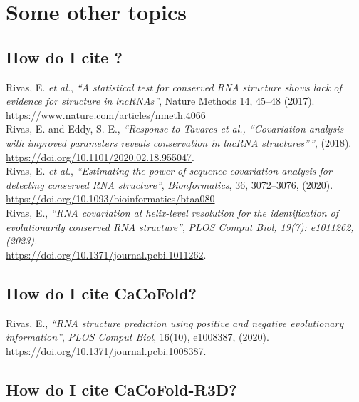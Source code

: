 
\section{Some other topics}
\label{section:more}
\setcounter{footnote}{0}

\subsection{How do I cite \rscape?}

Rivas, E. \textit{et al.}, \textit{``A statistical test for conserved
  RNA structure shows lack of evidence for structure in lncRNAs''},
Nature Methods 14, 45–48 (2017).\\
\url{https://www.nature.com/articles/nmeth.4066}\\

\noindent
Rivas, E. and Eddy, S. E., \textit{``Response to Tavares et al.,
  “Covariation analysis with improved parameters reveals conservation
  in lncRNA structures”''}, (2018).\\
\url{https://doi.org/10.1101/2020.02.18.955047}.\\

\noindent
Rivas, E. \textit{et al.}, \textit{``Estimating the power of sequence
  covariation analysis for detecting conserved RNA structure''},
\textit{Bionformatics}, 36, 3072–3076, (2020).\\
\url{https://doi.org/10.1093/bioinformatics/btaa080}\\

\noindent
Rivas, E., \textit{``RNA covariation at helix-level resolution for the identification of evolutionarily conserved RNA structure''},
\textit{PLOS Comput Biol, 19(7): e1011262, (2023).}\\
  \url{https://doi.org/10.1371/journal.pcbi.1011262}.\\

\subsection{How do I cite CaCoFold?}

Rivas, E., \textit{``RNA structure prediction using
  positive and negative evolutionary information''},
\textit{PLOS Comput Biol}, 16(10), e1008387, (2020).\\
\url{https://doi.org/10.1371/journal.pcbi.1008387}.\\

\subsection{How do I cite CaCoFold-R3D?}

